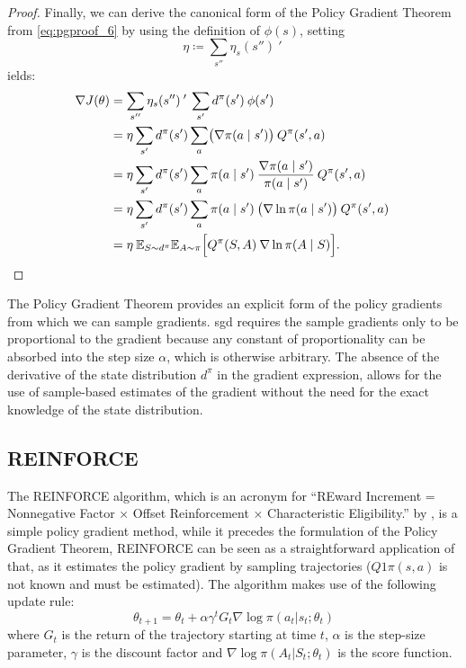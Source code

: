 \begin{proof}
	Finally, we can derive the canonical form of the Policy Gradient Theorem from \eqref{eq:pgproof_6} by using the definition of \(\phi(s)\), setting 
	\begin{equation*}
		\eta \coloneqq  \sum_{s''} \eta_s(s'') \:' \:  
	\end{equation*}
	 ields:
	\begin{align}
		\nabla J(\theta) &=  \sum_{s''} \eta_s(s'') \:' \:  \sum_{s'} d^\pi(s') \: \phi(s') \: \nonumber \\
		&= \eta \sum_{s'} d^\pi(s') \sum_{a} \bigl(\nabla \pi(a \mid s')\bigr) \: Q^\pi(s',a) \: \nonumber \\
		&= \eta \sum_{s'} d^\pi(s') \sum_{a} \pi(a \mid s') \: \frac{\nabla \pi(a \mid s')}{\pi(a \mid s')} \: Q^\pi(s',a) \: \nonumber \\
		&= \eta \sum_{s'} d^\pi(s') \sum_{a} \pi(a \mid s') \: \bigl(\nabla \ln \pi(a \mid s')\bigr) \: Q^\pi(s',a) \: \nonumber \\
		&= \eta \: \mathbb{E}_{S \sim d^\pi} \mathbb{E}_{A \sim \pi} \Bigl[Q^\pi(S,A) \: \nabla \ln \pi(A \mid S) \Bigr]. \nonumber
	\end{align}
\end{proof}

The Policy Gradient Theorem provides an explicit form of the policy gradients from which we can 
sample gradients. \gls{sgd} requires the sample gradients only to be
proportional to the gradient because any constant of proportionality can be absorbed
into the step size $\alpha$, which is otherwise arbitrary. The absence of the derivative of the state distribution $d^\pi$ 
in the gradient expression, allows for the use of sample-based estimates of the gradient without the 
need for the exact knowledge of the state distribution.

\subsection{REINFORCE}
The REINFORCE algorithm, which is an acronym for “REward Increment = Nonnegative
Factor × Offset Reinforcement × Characteristic Eligibility.” by \cite{10.1007/BF00992696}, is a 
simple policy gradient method, while it precedes the formulation of 
the Policy Gradient Theorem, REINFORCE can be seen as a straightforward application of that, as it
estimates the policy gradient by sampling trajectories ($Q1\pi(s, a)$ is not known and must be estimated).
The algorithm makes use of the following update rule:
\[
\theta_{t+1} = \theta_t + \alpha \gamma^t G_t \nabla \log \pi(a_t|s_t;\theta_t) 
\]
where \(G_t\) is the return of the trajectory starting at time \(t\), \(\alpha\) is the step-size parameter,
\(\gamma\) is the discount factor and \(\nabla \log \pi(A_t|S_t;\theta_t)\) is the score function.

